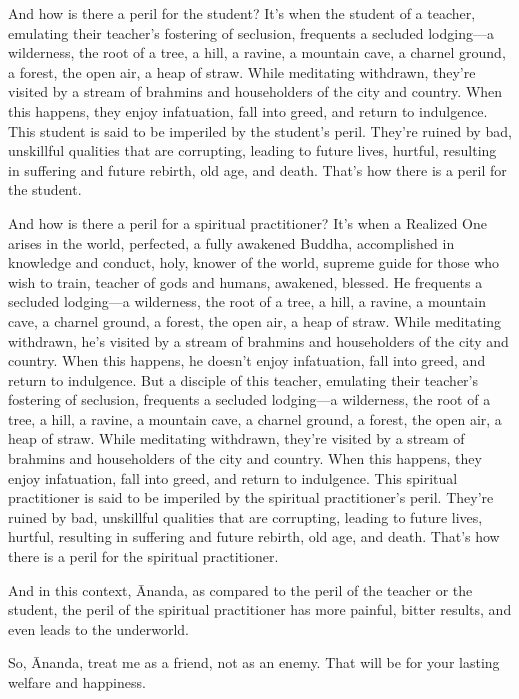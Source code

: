 \documentclass[12pt,openany]{book}%
\begin{document}
And how is there a peril for the student? It’s when the student of a teacher, emulating their teacher’s fostering of seclusion, frequents a secluded lodging—a wilderness, the root of a tree, a hill, a ravine, a mountain cave, a charnel ground, a forest, the open air, a heap of straw. While meditating withdrawn, they’re visited by a stream of brahmins and householders of the city and country. When this happens, they enjoy infatuation, fall into greed, and return to indulgence. This student is said to be imperiled by the student’s peril. They’re ruined by bad, unskillful qualities that are corrupting, leading to future lives, hurtful, resulting in suffering and future rebirth, old age, and death. That’s how there is a peril for the student. 

And how is there a peril for a spiritual practitioner? It’s when a Realized One arises in the world, perfected, a fully awakened Buddha, accomplished in knowledge and conduct, holy, knower of the world, supreme guide for those who wish to train, teacher of gods and humans, awakened, blessed. He frequents a secluded lodging—a wilderness, the root of a tree, a hill, a ravine, a mountain cave, a charnel ground, a forest, the open air, a heap of straw. While meditating withdrawn, he’s visited by a stream of brahmins and householders of the city and country. When this happens, he doesn’t enjoy infatuation, fall into greed, and return to indulgence. But a disciple of this teacher, emulating their teacher’s fostering of seclusion, frequents a secluded lodging—a wilderness, the root of a tree, a hill, a ravine, a mountain cave, a charnel ground, a forest, the open air, a heap of straw. While meditating withdrawn, they’re visited by a stream of brahmins and householders of the city and country. When this happens, they enjoy infatuation, fall into greed, and return to indulgence. This spiritual practitioner is said to be imperiled by the spiritual practitioner’s peril. They’re ruined by bad, unskillful qualities that are corrupting, leading to future lives, hurtful, resulting in suffering and future rebirth, old age, and death. That’s how there is a peril for the spiritual practitioner. 

And in this context, Ānanda, as compared to the peril of the teacher or the student, the peril of the spiritual practitioner has more painful, bitter results, and even leads to the underworld. 

So, Ānanda, treat me as a friend, not as an enemy. That will be for your lasting welfare and happiness. 
\end{document}
